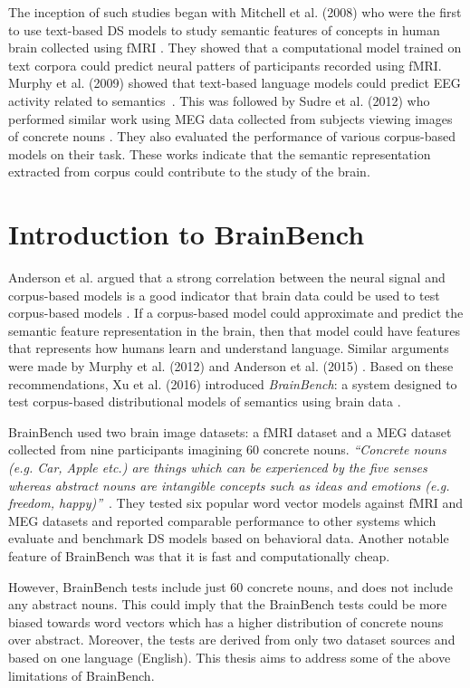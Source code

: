 The inception of such studies began with Mitchell et al. (2008) who were the first to use text-based DS models to study semantic features of concepts in human brain collected using fMRI \cite{Mitchell1191}. They showed that a computational model trained on text corpora could predict neural patters of participants recorded using fMRI.  Murphy et al. (2009) showed that text-based language models could predict EEG activity related to semantics~\cite{MurphyEEG}. This was followed by Sudre et al. (2012) who performed similar work using MEG data collected from subjects viewing images of concrete nouns \cite{SUDRE2012451}.  They also evaluated the performance of various corpus-based models on their task. These works indicate that the semantic representation extracted from corpus could contribute to the study of the brain. 

\section{Introduction to BrainBench}
Anderson et al. argued that a strong correlation between the neural signal and corpus-based models \cite{Mitchell1191, MurphyEEG, SUDRE2012451} is a good indicator that brain data could be used to test corpus-based models \cite{andersonBrainEyes}. If a corpus-based model could approximate and predict the semantic feature representation in the brain, then that model could have features that represents how humans learn and understand language. Similar arguments were made by Murphy et al. (2012) \cite{Murphy2012} and Anderson et al. (2015) \cite{Anderson2015}. Based on these recommendations, Xu et al. (2016) introduced \textit{BrainBench}: a system designed to test corpus-based distributional models of semantics using brain data \cite{BrainBench2016}. 

BrainBench used two brain image datasets: a fMRI dataset \cite{Mitchell1191} and a MEG dataset \cite{SUDRE2012451} collected from nine participants imagining 60 concrete nouns. \textit{``Concrete nouns (e.g. Car, Apple etc.) are things which can be experienced by the five senses whereas abstract nouns are intangible concepts such as ideas and emotions (e.g. freedom, happy)''}~\cite{wiki:xxx}. They tested six popular word vector models against fMRI and MEG datasets and reported comparable performance to other systems which evaluate and benchmark DS models based on behavioral data. Another notable feature of BrainBench was that it is fast and computationally cheap. 

However, BrainBench tests include just 60 concrete nouns, and does not include any abstract nouns. This could imply that the BrainBench tests could be more biased towards word vectors which has a higher distribution of concrete nouns over abstract. Moreover, the tests are derived from only two dataset sources and based on one language (English). This thesis aims to address some of the above limitations of BrainBench.
\bigbreak

